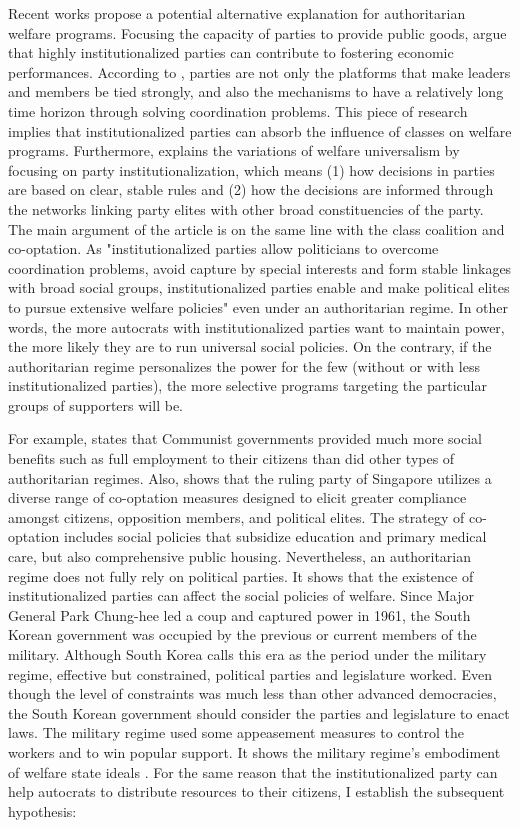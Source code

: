 \documentclass[12pt, letterpage, notitlepage]{article}
\begin{document}
Recent works propose a potential alternative explanation for authoritarian welfare programs. Focusing the capacity of parties to provide public goods, \citet{Bizzarro2018} argue that highly institutionalized parties can contribute to fostering economic performances. According to \citet{Bizzarro2018}, parties are not only the platforms that make leaders and members be tied strongly, and also the mechanisms to have a relatively long time horizon through solving coordination problems. This piece of research implies that institutionalized parties can absorb the influence of classes on welfare programs. Furthermore, \citet{Rasmussen2019} explains the variations of welfare universalism by focusing on party institutionalization, which means (1) how decisions in parties are based on clear, stable rules and (2) how the decisions are informed through the networks linking party elites with other broad constituencies of the party. The main argument of the article is on the same line with the class coalition and co-optation. As "institutionalized parties allow politicians to overcome coordination problems, avoid capture by special interests and form stable linkages with broad social groups, institutionalized parties enable and make political elites to pursue extensive welfare policies" even under an authoritarian regime. In other words, the more autocrats with institutionalized parties want to maintain power, the more likely they are to run universal social policies. On the contrary, if the authoritarian regime personalizes the power for the few (without or with less institutionalized parties), the more selective programs targeting the particular groups of supporters will be. 

For example, \citet{Orenstein2008} states that Communist governments provided much more social benefits such as full employment to their citizens than did other types of authoritarian regimes. Also, \citet{Morgenbesser2017} shows that the ruling party of Singapore utilizes a diverse range of co-optation measures designed to elicit greater compliance amongst citizens, opposition members, and political elites. The strategy of co-optation includes social policies that subsidize education and primary medical care, but also comprehensive public housing. Nevertheless, an authoritarian regime does not fully rely on political parties. It shows that the existence of institutionalized parties can affect the social policies of welfare. Since Major General Park Chung-hee led a coup and captured power in 1961, the South Korean government was occupied by the previous or current members of the military. Although South Korea calls this era as the period under the military regime, effective but constrained, political parties and legislature worked. Even though the level of constraints was much less than other advanced democracies, the South Korean government should consider the parties and legislature to enact laws. The military regime used some appeasement measures to control the workers and to win popular support. It shows the military regime’s embodiment of welfare state ideals \citep[90-93]{Tang2000}. For the same reason that the institutionalized party can help autocrats to distribute resources to their citizens, I establish the subsequent hypothesis:\par
\end{document}
